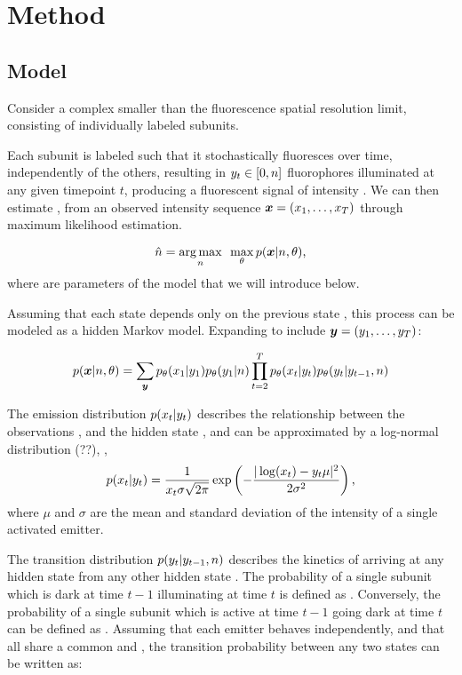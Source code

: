 \section{Method}

\subsection{Model}

Consider a complex smaller than the fluorescence spatial resolution limit,
consisting of \n individually labeled subunits.

Each subunit is labeled such that it stochastically fluoresces over time,
independently of the others, resulting in $y_{t} \in [0, n]$ fluorophores
illuminated at any given timepoint $t$, producing a fluorescent signal of
intensity . We can then estimate \n, from an observed intensity sequence
$\bm{x} = (x_{1},\ldots,x_{T})$ through maximum likelihood estimation.

\begin{equation}
  \hat{n} =
    \mathop{\arg\max}_{n}\hspace{0.5em}
    \max_\theta
    p(\bm{x}|n,\theta)
  \text{,}
\end{equation}
%
where \parameters are parameters of the model that we will introduce below.

Assuming that each state  depends only on the previous state , this process can be modeled as a hidden Markov model. Expanding to include $\bm{y} = \left( y_{1}, \ldots, y_{T} \right)$:

\begin{equation}
  p(\bm{x}|n,\theta) =
    \sum_{\bm{y}}
    p_\theta(x_{1}|y_{1}) p_\theta(y_{1}|n)
    \prod_{t=2}^{T}
    p_\theta(x_{t}|y_{t}) p_\theta(y_{t}|y_{t-1},n)
\end{equation}

The emission distribution $p(x_{t}|y_{t})$ describes the relationship
between the observations \trace, and the hidden state \states, and can be
approximated by a log-normal distribution (??), \ie,
%
\begin{equation}
  p(x_{t}|y_{t}) =
    \frac{1}{x_{t}\sigma\sqrt{2\pi}}
    \exp \left(
      - \frac{|\log(x_{t}) - y_{t}\mu|^2}{2\sigma^2}
    \right)
  \text{,}
\end{equation}
%
where $\mu$ and $\sigma$ are the mean and standard deviation of the intensity
of a single activated emitter.

The transition distribution $p(y_{t}|y_{t-1},n)$ describes the kinetics of
arriving at any hidden state  from any other hidden state . The
probability of a single subunit which is dark at time $t-1$ illuminating at
time $t$ is defined as \pon. Conversely, the probability of a single subunit
which is active at time $t-1$ going dark at time $t$ can be defined as \poff.
Assuming that each emitter behaves independently, and that all share a common
\pon and \poff, the transition probability between any two states can be
written as:

